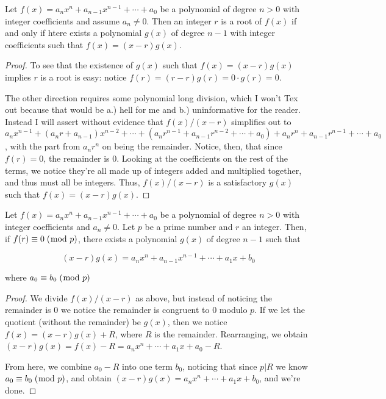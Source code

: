 \documentclass[../main.tex]{subfiles}
\begin{document}
\begin{thm} \label{6.1}
  Let $f(x) = a_n x^n + a_{n-1} x^{n-1} + \cdots + a_0$ be a polynomial of degree $n > 0$ with integer coefficients and assume $a_n \neq 0$. Then an integer $r$ is a root of $f(x)$ if and only if htere exists a polynomial $g(x)$ of degree $n-1$ with integer coefficients such that $f(x) = (x-r)g(x)$.
\end{thm}

\begin{proof}
  To see that the existence of $g(x)$ such that $f(x) = (x-r) g(x)$ implies $r$ is a root is easy: notice $f(r) = (r-r) g(r) = 0 \cdot g(r) = 0$.

  The other direction requires some polynomial long division, which I won't Tex out because that would be a.) hell for me and b.) uninformative for the reader. Instead I will assert without evidence that $f(x) / (x-r)$ simplifies out to $a_n x^{n-1} + (a_n r + a_{n-1})x^{n-2} + \cdots + (a_n r^{n-1} + a_{n-1} r^{n-2} + \cdots + a_0) + a_n r^n + a_{n-1}r^{n-1} + \cdots + a_0$, with the part from $a_n r^n$ on being the remainder. Notice, then, that since $f(r) = 0$, the remainder is $0$. Looking at the coefficients on the rest of the terms, we notice they're all made up of integers added and multiplied together, and thus must all be integers. Thus, $f(x) / (x-r)$ is a satisfactory $g(x)$ such that $f(x) = (x-r) g(x)$.
\end{proof}



\begin{thm} \label{6.2}
  Let $f(x) = a_n x^n + a_{n-1} x^{n-1} + \cdots + a_0$ be a polynomial of degree $n > 0$ with integer coefficients and $a_n \neq 0$. Let $p$ be a prime number and $r$ an integer. Then, if $f(r) \equiv 0 \; (\bmod \; p)$, there exists a polynomial $g(x)$ of degree $n-1$ such that

  $$(x-r)g(x) = a_nx^n + a_{n-1}x^{n-1} + \cdots + a_1x + b_0$$

  where $a_0 \equiv b_0 \; (\bmod \; p)$
\end{thm}

\begin{proof}
  We divide $f(x) / (x-r)$ as above, but instead of noticing the remainder is $0$ we notice the remainder is congruent to $0$ modulo $p$. If we let the quotient (without the remainder) be $g(x)$, then we notice $f(x) = (x-r) g(x) + R$, where $R$ is the remainder. Rearranging, we obtain $(x-r) g(x) = f(x) - R = a_n x^n + \cdots + a_1 x + a_0 - R$.

  From here, we combine $a_0 - R$ into one term $b_0$, noticing that since $p | R$ we know $a_0 \equiv b_0 \; (\bmod \; p)$, and obtain $(x-r) g(x) = a_n x^n + \cdots + a_1 x + b_0$, and we're done.
\end{proof}
\end{document}
